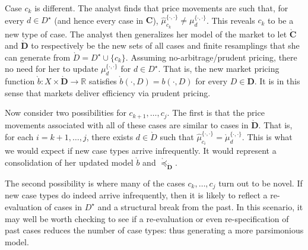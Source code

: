 \documentclass[ecta,nameyear,draft]{econsocart}
\newcommand{\R}{\mathbb R}
\newcommand{\mbbd}{{\mathbf D}}
\newcommand{\mbbc}{{\mathbf C}}
\newcommand{\past}{{D^\star}}
\theoremstyle{plain}
\theoremstyle{remark}
\begin{document}
Case $c_{k}$ is different. The analyst finds that price movements are such
that, for every $d \in \past$ (and hence every case in $\mbbc$),
$\hat{\mu}^{\{\cdot,\cdot\}}_{c_{k}} \neq \mu^{\{\cdot,\cdot\}}_{d}$.  This
reveals $c_{k}$ to be a new type of case.  The analyst then {generalizes} her
model of the market to let $\grave{\mbbc}$ and $\grave{\mbbd}$ to respectively
be the new sets of all cases and finite resamplings that she can generate from
$\grave{D} = \past \cup \{c_{k}\}$. Assuming no-arbitrage/prudent pricing,
there no need for her to update $\mu^{\{\cdot,\cdot\}}_{d}$ for $d \in \past$.
That is, the new market pricing function $\grave{b}: X \times \grave{\mbbd}
\rightarrow \R$ satisfies $\grave{b}(\cdot, D) = b(\cdot, D)$ for every $D \in
\mbbd$. It is in this sense that markets deliver efficiency via prudent
pricing.

Now consider two possibilities for $c_{k+1},\dots,c_{j}$. The first is that the
price movements associated with all of these cases are similar to cases in
$\grave{\mbbd}$. That is, for each $i=k+1,\dots,j$, there exists $d\in
\grave{D}$ such that $\hat{\mu}^{\{\cdot,\cdot\}}_{c_{i}} =
\grave{\mu}^{\{\cdot,\cdot\}}_{d}$. This is what we would expect if new case
types arrive infrequently. It would represent a consolidation of her updated
model $\grave{b}$ and $\grave{\preceq}_{\grave{\mbbd}}$.

The second possibility is where many of the cases $c_{k},\dots,c_{j}$ turn out
to be novel.  If new case types do indeed arrive infrequently, then it is
likely to reflect a re-evaluation of cases in $\past$ and a structural break
from the past. In this scenario, it may well be worth checking to see if a
re-evaluation or even re-specification of past cases reduces the number of case
types: thus generating a more parsimonious model.
\end{document}
